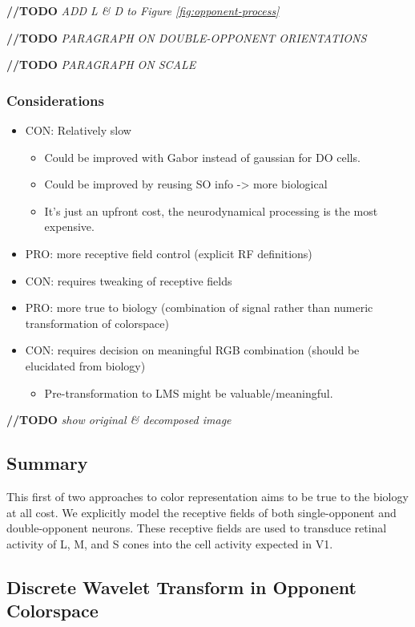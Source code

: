 \documentclass[journal,onecolumn]{IEEEtran}
\begin{document}
\textbf{//TODO} \textit{ADD L \& D to Figure \ref{fig:opponent-process}}

\textbf{//TODO} \textit{PARAGRAPH ON DOUBLE-OPPONENT ORIENTATIONS}

\textbf{//TODO} \textit{PARAGRAPH ON SCALE}

\subsubsection{Considerations}
\begin{itemize}
    \item CON: Relatively slow
    \begin{itemize}
        \item Could be improved with Gabor instead of gaussian for DO cells.
        \item Could be improved by reusing SO info -> more biological
        \item It's just an upfront cost, the neurodynamical processing is the most expensive.
    \end{itemize}
    \item PRO: more receptive field control (explicit RF definitions)
    \item CON: requires tweaking of receptive fields
    \item PRO: more true to biology (combination of signal rather than numeric transformation of colorspace)
    \item CON: requires decision on meaningful RGB combination (should be elucidated from biology)
    \begin{itemize}
        \item Pre-transformation to LMS might be valuable/meaningful.
    \end{itemize}
\end{itemize}

\textbf{//TODO} \textit{show original \& decomposed image}


\subsection*{Summary}

This first of two approaches to color representation aims to be true to the biology at all cost. We explicitly model the receptive fields of both single-opponent and double-opponent neurons. These receptive fields are used to transduce retinal activity of L, M, and S cones into the cell activity expected in V1.


\subsection{Discrete Wavelet Transform in Opponent Colorspace}
\end{document}
